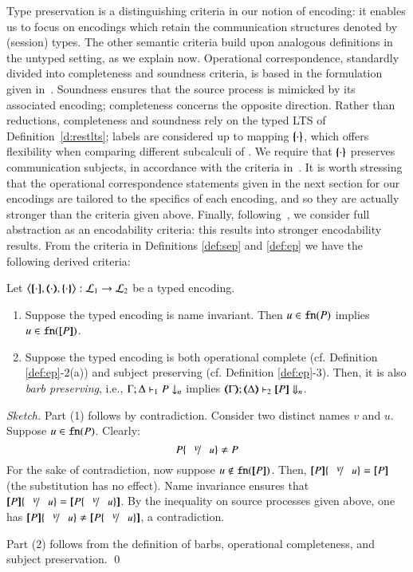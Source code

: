 \noi Type preservation is a distinguishing criteria in our notion of encoding: it enables us to focus on encodings which retain the communication structures denoted by (session) types.
The other semantic
criteria build upon analogous definitions in the untyped setting, as we explain now. 
Operational correspondence, standardly divided into completeness and soundness criteria, is based
in the formulation given in~\cite{DBLP:journals/iandc/Gorla10,DBLP:conf/icalp/LanesePSS10}. 
Soundness ensures that the source process is mimicked 
by its associated encoding; completeness concerns the opposite direction.
Rather than reductions, completeness and soundness rely on 
the typed LTS of Definition~\ref{d:restlts}; labels are considered up to  mapping $\{\!\!\{\cdot\}\!\!\}$, which offers flexibility when comparing different subcalculi of \HOp. We require that $\{\!\!\{\cdot\}\!\!\}$ preserves communication subjects, in accordance with the criteria in~\cite{DBLP:conf/icalp/LanesePSS10}.
It is worth stressing that 
the operational correspondence statements given in
 the next section for our  encodings 
 are tailored to the specifics of each encoding, and so they
 are actually stronger than the criteria given above.
Finally, following~\cite{San923,DBLP:conf/lics/PalamidessiSVV06},
we consider full abstraction as an encodability criteria: this results into 
stronger encodability results. 
From the criteria in Definitions \ref{def:sep} and \ref{def:ep}
we have the following derived criteria: 

\begin{proposition}
Let
	$\enco{\map{\cdot}, \mapt{\cdot}, \mapa{\cdot}}: \tyl{L}_1 \to \tyl{L}_2$
	be a typed encoding.
	\begin{enumerate}[1.]
	\item Suppose the typed encoding is name invariant. Then $u \in \mathtt{fn}(P)$ implies $u \in \mathtt{fn}([\!\![P]\!\!])$.
	\item Suppose the typed encoding is both
 operational complete (cf. Definition \ref{def:ep}-2(a)) 
 and subject preserving (cf. Definition \ref{def:ep}-3).
 Then, it is also \emph{barb preserving}, i.e., 
$\Gamma; \Delta \vdash_1 P \downarrow_{n}$
implies
$\mapt{\Gamma}; \mapt{\Delta} \proves_2 \map{P} \Barb{n}$.
\end{enumerate}
\end{proposition}

\begin{proof}[Sketch]
Part (1) follows by contradiction.
Consider two distinct names $v$ and $u$.
Suppose $u \in \mathtt{fn}(P)$. Clearly:
$$P\subst{v}{u} \neq P$$
For the sake of contradiction, now suppose $u \not\in \mathtt{fn}([\!\![P]\!\!])$.
Then, $\map{P}\subst{v}{u} = \map{P}$ (the substitution has no effect). 
Name invariance  ensures that
$\map{P}\subst{v}{u} = \map{P\subst{v}{u}}$. 
By the inequality
on source processes given above, one has $\map{P}\subst{v}{u} \neq \map{P\subst{v}{u}}$,
a contradiction.

Part (2) follows from the definition of barbs, operational completeness, and subject preservation.
\qed
\end{proof}



